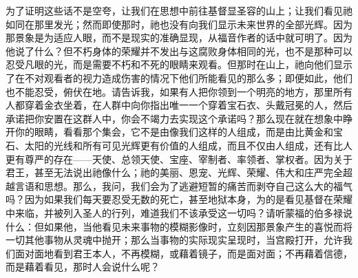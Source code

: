 为了证明这些话不是空夸，让我们在思想中前往基督显圣容的山上；让我们看见祂如同在那里发光；然而即使那时，祂也没有向我们显示未来世界的全部光辉。因为那景象是为适应人眼，而不是现实的准确显现，从福音作者的话中就可明了。因为他说了什么？但不朽身体的荣耀并不发出与这腐败身体相同的光，也不是那种可以忍受凡眼的光，而是需要不朽和不死的眼睛来观看。但那时在山上，祂向他们显示了在不对观看者的视力造成伤害的情况下他们所能看见的那么多；即便如此，他们也不能忍受，俯伏在地。请告诉我，如果有人把你领到一个明亮的地方，那里所有人都穿着金衣坐着，在人群中向你指出唯一一个穿着宝石衣、头戴冠冕的人，然后承诺把你安置在这群人中，你会不竭力去实现这个承诺吗？那么现在就在想象中睁开你的眼睛，看看那个集会，它不是由像我们这样的人组成，而是由比黄金和宝石、太阳的光线和所有可见光辉更有价值的人组成，而且不仅由人组成，还有比人更有尊严的存在——天使、总领天使、宝座、宰制者、率领者、掌权者。因为关于君王，甚至无法说出祂像什么；祂的美丽、恩宠、光辉、荣耀、伟大和庄严完全超越言语和思想。那么，我问，我们会为了逃避短暂的痛苦而剥夺自己这么大的福气吗？因为如果我们每天要忍受无数的死亡，甚至地狱本身，为的是看见基督在荣耀中来临，并被列入圣人的行列，难道我们不该承受这一切吗？请听蒙福的伯多禄说什么：但如果他，当他看见未来事物的模糊影像时，立刻因那景象产生的喜悦而将一切其他事物从灵魂中抛开；那么当事物的实际现实呈现时，当宫殿打开，允许我们面对面地看到君王本人，不再模糊，或藉着镜子，而是面对面；不再藉着信德，而是藉着看见，那时人会说什么呢？\par

